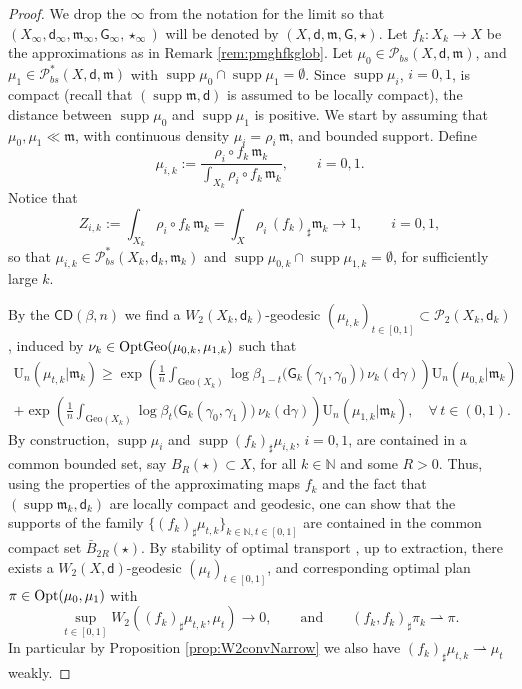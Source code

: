 \documentclass[11pt,a4paper]{article}
\theoremstyle{plain}
\theoremstyle{definition}
\theoremstyle{remark}
\numberwithin{equation}{section}
\newcommand{\N}{\mathbb{N}} %
\DeclareMathOperator{\supp}{\mathrm{supp}}
\newcommand{\CD}{\mathsf{CD}}
\newcommand{\Geo}{\mathrm{Geo}}
\newcommand{\OptGeo}{{\rm OptGeo}}
\newcommand{\Opt}{{\rm Opt}}
\newcommand{\U}{\mathrm{U}}
\newcommand{\Prob}{\mathcal{P}}
\newcommand{\di}{\mathrm{d}}
\newcommand{\mm}{\mathfrak m}
\newcommand{\sfd}{\mathsf d}
\newcommand{\sfG}{\mathsf G}
\begin{document}
\begin{proof}
We drop the $\infty$ from the notation for the limit so that $(X_\infty,\sfd_\infty,\mm_\infty,\sfG_\infty,\star_\infty)$ will be denoted by $(X,\sfd,\mm,\sfG,\star)$.
Let $f_k :X_k \to X$ be the approximations as in Remark \ref{rem:pmghfkglob}.
Let $\mu_0\in \mathcal{P}_{bs}(X,\sfd,\mm)$, and $\mu_1 \in \Prob_{bs}^{*}(X,\sfd,\mm)$  with $\supp \mu_{0}\cap \supp \mu_{1}=\emptyset$.  Since $\supp  \mu_i$, $i=0,1$, is compact (recall that $(\supp\mm,\sfd)$ is assumed to be locally compact), the distance between $\supp \mu_0$ and $\supp \mu_1$ is positive. We start by assuming that $\mu_0,\mu_1 \ll \mm$, with continuous density $\mu_i = \rho_i\, \mm$, and bounded support. Define
\begin{equation}
\mu_{i,k}:=\frac{\rho_i \circ f_k \, \mm_k}{\int_{X_k} \rho_i \circ f_k\, \mm_k}, \qquad i=0,1.
\end{equation}
Notice that 
\begin{equation}
Z_{i,k}:=\int_{X_k} \rho_i \circ f_k \, \mm_k = \int_{X}\rho_i \, (f_k)_\sharp \mm_k \to 1, \qquad i=0,1,
\end{equation}
so that $\mu_{i,k}\in \Prob_{bs}^{*}(X_{k}, \sfd_{k}, \mm_{k})$ and  $\supp \mu_{0,k}\cap \supp \mu_{1,k}=\emptyset$,   for sufficiently large $k$.

By the $\CD(\beta,n)$ we find a $W_2(X_k,\sfd_k)$-geodesic $(\mu_{t,k})_{t\in [0,1]}\subset \Prob_2(X_k,\sfd_k)$, induced by $\nu_k\in\OptGeo(\mu_{0,k},\mu_{1,k})$ such that
\begin{multline}\label{eq:tolimit-CD}
\U_{n}(\mu_{t,k}|\mm_k) \geq   \exp\left( \frac{1}{n}\int_{\Geo(X_k)} \log \beta_{1-t}\big(\sfG_k(\gamma_1,\gamma_0))\, \nu_k(\di\gamma) \right) \U_{n}(\mu_{0,k}|\mm_k)  \\
+\exp\left( \frac{1}{n}\int_{\Geo(X_k)} \log \beta_{t}\big(\sfG_k(\gamma_0,\gamma_1)\big) \, \nu_k(\di\gamma) \right)   \U_{n}(\mu_{1,k}|\mm_k), \quad \forall\, t\in (0,1).
\end{multline}
By construction, $\supp\mu_i$ and $\supp(f_k)_\sharp \mu_{i,k}$, $i=0,1$, are contained in a common bounded set, say $B_R(\star)\subset X$, for all $k\in \N$ and some $R>0$. Thus, using the properties of the approximating maps $f_k$ and the fact that $(\supp\mm_k,\sfd_k)$ are locally compact and geodesic, one can show that the supports of the family $\{(f_k)_\sharp \mu_{t,k}\}_{k\in \N,t\in [0,1]}$ are contained in the common compact set $\bar{B}_{2R}(\star)$. By stability of optimal transport \cite[Thm.\@ 28.9]{Vil}, up to extraction, there exists a $W_2(X,\sfd)$-geodesic $(\mu_t)_{t\in[0,1]}$, and corresponding optimal plan $\pi\in \Opt(\mu_0,\mu_1)$ with
\begin{equation}
\sup_{t\in [0,1]} W_2((f_k)_\sharp \mu_{t,k},\mu_t) \to 0, \qquad \text{and} \qquad (f_k,f_k)_\sharp \pi_k \rightharpoonup \pi.
\end{equation}
In particular by Proposition \ref{prop:W2convNarrow} we also have $(f_k)_\sharp\mu_{t,k} \rightharpoonup \mu_t$ weakly. 



\end{proof}
\end{document}
